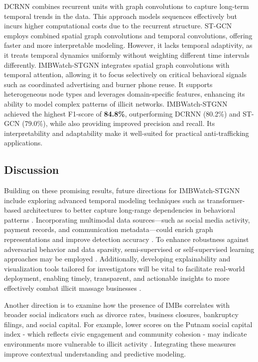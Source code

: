 \documentclass[letterpaper]{article} %
\begin{document}
DCRNN combines recurrent units with graph convolutions to capture long-term temporal trends in the data. This approach models sequences effectively but incurs higher computational costs due to the recurrent structure. ST-GCN employs combined spatial graph convolutions and temporal convolutions, offering faster and more interpretable modeling. However, it lacks temporal adaptivity, as it treats temporal dynamics uniformly without weighting different time intervals differently. IMBWatch-STGNN integrates spatial graph convolutions with temporal attention, allowing it to focus selectively on critical behavioral signals such as coordinated advertising and burner phone reuse. It supports heterogeneous node types and leverages domain-specific features, enhancing its ability to model complex patterns of illicit networks. IMBWatch-STGNN achieved the highest F1-score of \textbf{84.8\%}, outperforming DCRNN (80.2\%) and ST-GCN (79.0\%), while also providing improved precision and recall. Its interpretability and adaptability make it well-suited for practical anti-trafficking applications.



\subsection{Discussion}
Building on these promising results, future directions for IMBWatch-STGNN include exploring advanced temporal modeling techniques such as transformer-based architectures to better capture long-range dependencies in behavioral patterns \cite{vaswani2017attention, wu2020comprehensive}. Incorporating multimodal data sources—such as social media activity, payment records, and communication metadata—could enrich graph representations and improve detection accuracy \cite{jiang2022multimodal}. To enhance robustness against adversarial behavior and data sparsity, semi-supervised or self-supervised learning approaches may be employed \cite{zhu2020deep, you2020graph}. Additionally, developing explainability and visualization tools tailored for investigators will be vital to facilitate real-world deployment, enabling timely, transparent, and actionable insights to more effectively combat illicit massage businesses \cite{ying2019gnnexplainer, ribeiro2016why}.

Another direction is to examine how the presence of IMBs correlates with broader social indicators such as divorce rates, business closures, bankruptcy filings, and social capital. For example, lower scores on the Putnam social capital index - which reflects civic engagement and community cohesion - may indicate environments more vulnerable to illicit activity \cite{Putnam2000}. Integrating these measures improve contextual understanding and predictive modeling.
\end{document}
